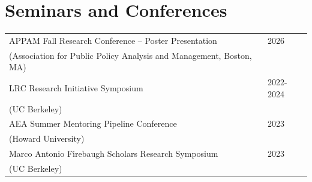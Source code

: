 \section{\sc Seminars and Conferences}
\begin{tabular}{@{}p{4.25in}p{2in}}

APPAM Fall Research Conference -- Poster Presentation & 2026 \\
(Association for Public Policy Analysis and Management, Boston, MA) \\ 

LRC Research Initiative Symposium & 2022-2024 \\
(UC Berkeley) \\ 

AEA Summer Mentoring Pipeline Conference & 2023 \\ 
(Howard University) \\

Marco Antonio Firebaugh Scholars Research Symposium & 2023 \\ (UC Berkeley) \\

\end{tabular}



\endinput
